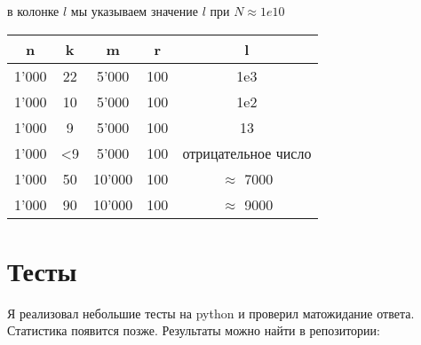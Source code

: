\documentclass{revtex4}
\begin{document}
в колонке $l$ мы указываем значение $l$ при $N \approx 1e10$ \\ 
\begin{tabular}{c|c|c|c|c}
    n & k & m & r & l \\
    \hline
    1'000 & 22 & 5'000 & 100 & 1e3 \\
    1'000 & 10 & 5'000 & 100 & 1e2 \\
    1'000 & 9 & 5'000 & 100 & 13 \\
    1'000 & <9 & 5'000 & 100 & отрицательное число \\
    1'000 & 50 & 10'000 & 100 & $\approx$ 7000 \\
    1'000 & 90 & 10'000 & 100 & $\approx$ 9000 \\
\end{tabular}

\section*{Тесты}

Я реализовал небольшие тесты на python и проверил матожидание ответа. Статистика появится позже. 
Результаты можно найти в репозитории:
\end{document}
